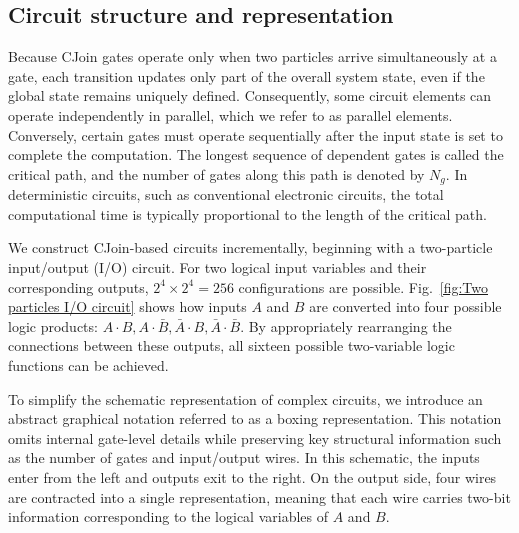 \documentclass[%
 reprint,
superscriptaddress,
 amsmath,amssymb,
 aps,
 prx,
]{revtex4-2}
\begin{document}
\subsection{Circuit structure and representation}
Because CJoin gates operate only when two particles arrive simultaneously at a gate, each transition updates only part of the overall system state, even if the global state remains uniquely defined. Consequently, some circuit elements can operate independently in parallel, which we refer to as parallel elements. Conversely, certain gates must operate sequentially after the input state is set to complete the computation. The longest sequence of dependent gates is called the critical path, and the number of gates along this path is denoted by $N_g$. In deterministic circuits, such as conventional electronic circuits, the total computational time is typically proportional to the length of the critical path.

We construct CJoin-based circuits incrementally, beginning with a two-particle input/output (I/O) circuit. For two logical input variables and their corresponding outputs, $2^4 \times 2^4 = 256$ configurations are possible. Fig.~\ref{fig:Two particles I/O circuit} shows how inputs $A$ and $B$ are converted into four possible logic products:  $A \cdot B, {A} \cdot \bar{B},\bar{A} \cdot {B},\bar{A} \cdot \bar{B}$. 
By appropriately rearranging the connections between these outputs, all sixteen possible two-variable logic functions can be achieved.

To simplify the schematic representation of complex circuits, we introduce an abstract graphical notation referred to as a boxing representation. This notation omits internal gate-level details while preserving key structural information such as the number of gates and input/output wires. In this schematic, the inputs enter from the left and outputs exit to the right. On the output side, four wires are contracted into a single representation, meaning that each wire carries two-bit information corresponding to the logical variables of $A$ and $B$.
\end{document}
